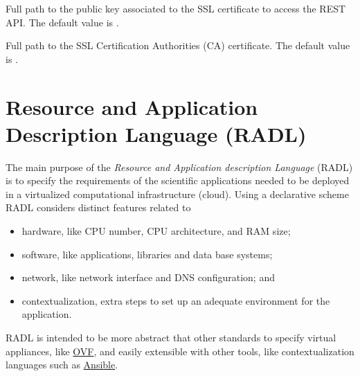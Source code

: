 \documentclass[letterpaper,10pt,english]{sphinxmanual}
\begin{document}

\begin{fulllineitems}
\label{manual:confval-REST_SSL_CERTFILE}
Full path to the public key associated to the SSL certificate to access
the REST API.
The default value is .

\end{fulllineitems}


\begin{fulllineitems}
\label{manual:confval-REST_SSL_CA_CERTS}
Full path to the SSL Certification Authorities (CA) certificate.
The default value is .

\end{fulllineitems}



\chapter{Resource and Application Description Language (RADL)}
\label{radl::doc}\label{radl:resource-and-application-description-language-radl}
The main purpose of the \emph{Resource and Application description Language} (RADL)
is to specify the requirements of the scientific applications needed to be
deployed in a virtualized computational infrastructure (cloud). Using a
declarative scheme RADL considers distinct features related to
\begin{itemize}
\item {} 
hardware, like CPU number, CPU architecture, and RAM size;

\item {} 
software, like applications, libraries and data base systems;

\item {} 
network, like network interface and DNS configuration; and

\item {} 
contextualization, extra steps to set up an adequate environment for the
application.

\end{itemize}

RADL is intended to be more abstract that other standards to specify virtual
appliances, like \href{http://www.dmtf.org/standards/ovf}{OVF}, and easily
extensible with other tools, like contextualization languages such as
\href{http://www.ansible.com}{Ansible}.
\end{document}
